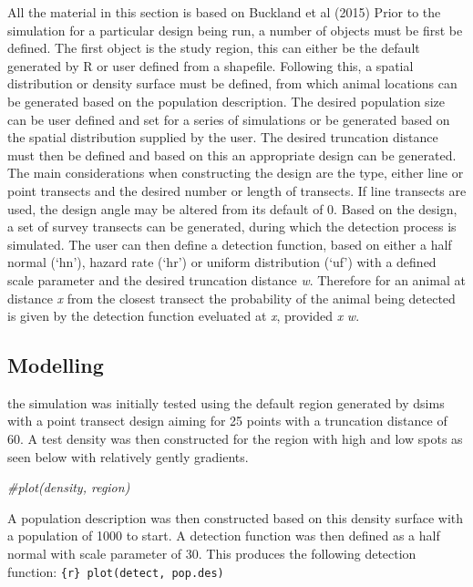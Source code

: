 \documentclass[
]{article}
\newenvironment{Shaded}{\begin{snugshade}}{\end{snugshade}}
\newcommand{\CommentTok}[1]{\textcolor[rgb]{0.56,0.35,0.01}{\textit{#1}}}
\begin{document}
All the material in this section is based on Buckland et al (2015) Prior
to the simulation for a particular design being run, a number of objects
must be first be defined. The first object is the study region, this can
either be the default generated by R or user defined from a shapefile.
Following this, a spatial distribution or density surface must be
defined, from which animal locations can be generated based on the
population description. The desired population size can be user defined
and set for a series of simulations or be generated based on the spatial
distribution supplied by the user. The desired truncation distance must
then be defined and based on this an appropriate design can be
generated. The main considerations when constructing the design are the
type, either line or point transects and the desired number or length of
transects. If line transects are used, the design angle may be altered
from its default of 0. Based on the design, a set of survey transects
can be generated, during which the detection process is simulated. The
user can then define a detection function, based on either a half normal
(`hn'), hazard rate (`hr') or uniform distribution (`uf') with a defined
scale parameter and the desired truncation distance \emph{w}. Therefore
for an animal at distance \emph{x} from the closest transect the
probability of the animal being detected is given by the detection
function eveluated at \emph{x}, provided \emph{x} \le \emph{w}.

\hypertarget{modelling}{%
\subsection{Modelling}\label{modelling}}

the simulation was initially tested using the default region generated
by dsims with a point transect design aiming for 25 points with a
truncation distance of 60. A test density was then constructed for the
region with high and low spots as seen below with relatively gently
gradients.

\begin{Shaded}
\begin{Highlighting}[]
\CommentTok{\#plot(density, region) }
\end{Highlighting}
\end{Shaded}

A population description was then constructed based on this density
surface with a population of 1000 to start. A detection function was
then defined as a half normal with scale parameter of 30. This produces
the following detection function: \texttt{\{r\}\ plot(detect,\ pop.des)}
\end{document}
